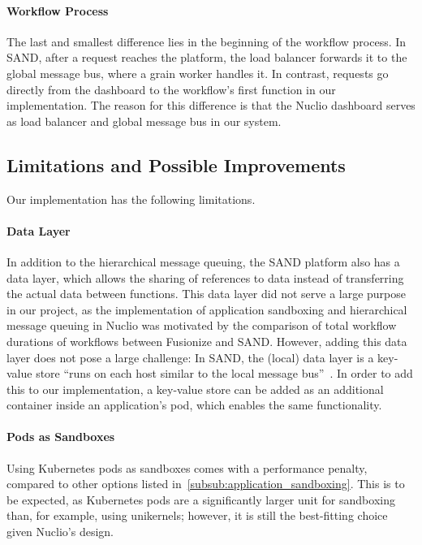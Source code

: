 \paragraph{Workflow Process}

The last and smallest difference lies in the beginning of the workflow process. 
In SAND, after a request reaches the platform, the load balancer forwards it to the global message bus, where a grain worker handles it.
In contrast, requests go directly from the dashboard to the workflow's first function in our implementation.
The reason for this difference is that the Nuclio dashboard serves as load balancer and global message bus in our system.

\subsection{Limitations and Possible Improvements}

Our implementation has the following limitations.

\paragraph{Data Layer}

In addition to the hierarchical message queuing, the SAND platform also has a data layer, which allows the sharing of references to data instead of transferring the actual data between functions.
This data layer did not serve a large purpose in our project, as the implementation of application sandboxing and hierarchical message queuing in Nuclio was motivated by the comparison of total workflow durations of workflows between Fusionize and SAND.
However, adding this data layer does not pose a large challenge: In SAND, the (local) data layer is a key-value store \enquote{runs on each host similar to the local message bus}~\cite{akkus2018sand}.
In order to add this to our implementation, a key-value store can be added as an additional container inside an application's pod, which enables the same functionality. 

\paragraph{Pods as Sandboxes}

Using Kubernetes pods as sandboxes comes with a performance penalty, compared to other options listed in~\ref{subsub:application_sandboxing}.
This is to be expected, as Kubernetes pods are a significantly larger unit for sandboxing than, for example, using unikernels; however, it is still the best-fitting choice given Nuclio's design.


